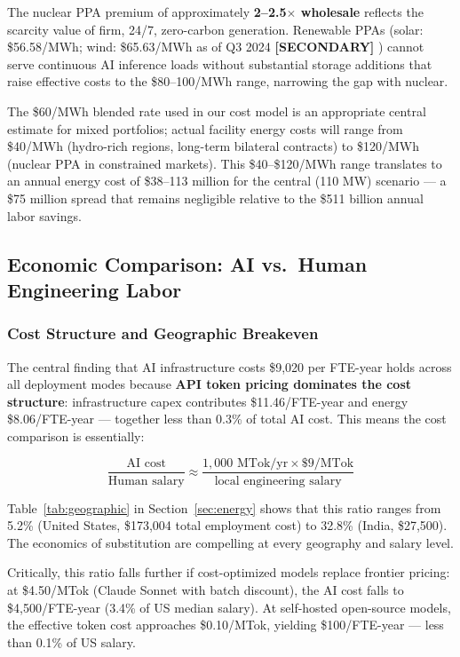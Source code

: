 \documentclass{article}
\newcommand{\SECONDARY}{\textbf{[SECONDARY]}}
\begin{document}
The nuclear PPA premium of approximately \textbf{2--2.5$\times$ wholesale} reflects the
scarcity value of firm, 24/7, zero-carbon generation. Renewable PPAs (solar: \$56.58/MWh;
wind: \$65.63/MWh as of Q3 2024 \SECONDARY{} \citep{levelten2024ppa}) cannot serve continuous AI inference
loads without substantial storage additions that raise effective costs to the
\$80--100/MWh range, narrowing the gap with nuclear.

The \$60/MWh blended rate used in our cost model is an appropriate central estimate for
mixed portfolios; actual facility energy costs will range from \$40/MWh (hydro-rich regions,
long-term bilateral contracts) to \$120/MWh (nuclear PPA in constrained markets). This
\$40--\$120/MWh range translates to an annual energy cost of \$38--113 million for the
central (110 MW) scenario --- a \$75 million spread that remains negligible relative to the
\$511 billion annual labor savings.

\subsection{Economic Comparison: AI vs.\ Human Engineering Labor}
\label{sec:ai-economics}

\subsubsection{Cost Structure and Geographic Breakeven}

The central finding that AI infrastructure costs \$9,020 per FTE-year holds across all
deployment modes because \textbf{API token pricing dominates the cost structure}:
infrastructure capex contributes \$11.46/FTE-year and energy \$8.06/FTE-year --- together
less than 0.3\% of total AI cost. This means the cost comparison is essentially:

\[
\frac{\text{AI cost}}{\text{Human salary}} \approx
\frac{1{,}000\text{ MTok/yr} \times \$9/\text{MTok}}{\text{local engineering salary}}
\]

\noindent Table~\ref{tab:geographic} in Section~\ref{sec:energy} shows that this ratio
ranges from 5.2\% (United States, \$173,004 total employment cost) to 32.8\% (India,
\$27,500). The economics of substitution are compelling at every geography and salary level.

Critically, this ratio falls further if cost-optimized models replace frontier pricing:
at \$4.50/MTok (Claude Sonnet with batch discount), the AI cost falls to \$4,500/FTE-year
(3.4\% of US median salary). At self-hosted open-source models, the effective token cost
approaches \$0.10/MTok, yielding \$100/FTE-year --- less than 0.1\% of US salary.
\end{document}
